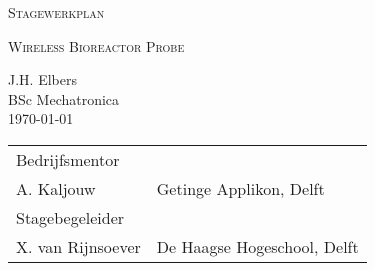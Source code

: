 \documentclass[12pt]{article}
\begin{document}
	\begin{titlepage}
		\centering
		\vspace{5cm}
		{\scshape\LARGE Stagewerkplan \par}
		{\scshape\large Wireless Bioreactor Probe\par}
		
		
		\vspace{1.2cm}
		{J.H. Elbers\\}
		{BSc Mechatronica \\}
		{\today}
		\vfill
		\vfill

	\begin{tabular}{p{4cm}l} 
		Bedrijfsmentor &  \\
		A. Kaljouw & Getinge Applikon, Delft \\
		
		\medskip
		Stagebegeleider & \\ 
		X. van Rijnsoever & De Haagse Hogeschool, Delft \\
		
		
	\end{tabular}

\textit{}

\end{titlepage} 
\rmfamily
\pagestyle{default}


\newpage




%













%




\renewcommand\refname{Literatuurlijst}

%

\newpage

\end{document}
